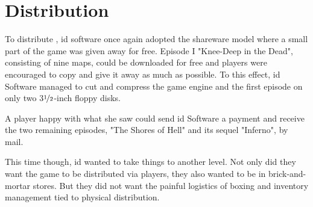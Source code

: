 \section{Distribution}
To distribute \doom, id software once again adopted the shareware model where a small part of the game was given away for free. Episode I "Knee-Deep in the Dead", consisting of nine maps, could be downloaded for free and players were encouraged to copy and give it away as much as possible. To this effect, id Software managed to cut and compress the game engine and the first episode on only two 3$\nicefrac{1}{2}$-inch floppy disks.\\
\par 
A player happy with what she saw could send id Software a payment and receive the two remaining episodes, "The Shores of Hell" and its sequel "Inferno", by mail.\\
\par
{}
\par
This time though, id wanted to take things to another level. Not only did they want the game to be distributed via players, they also wanted to be in brick-and-mortar stores. But they did not want the painful logistics of boxing and inventory management tied to physical distribution.\newpage





